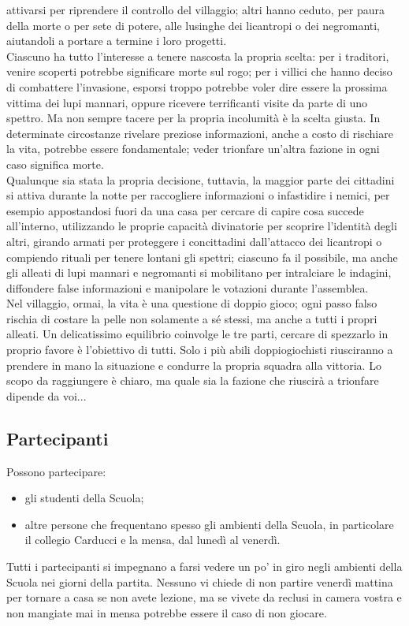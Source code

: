 \documentclass[a4paper,10pt]{article}
\begin{document}
attivarsi per riprendere il controllo del villaggio; altri hanno ceduto, per
paura della morte o per sete di potere, alle lusinghe dei licantropi o dei
negromanti, aiutandoli a portare a termine i loro progetti.\\
Ciascuno ha tutto l'interesse a tenere nascosta la propria scelta: per i
traditori, venire scoperti potrebbe significare morte sul rogo; per i villici
che hanno deciso di combattere l'invasione, esporsi troppo potrebbe voler dire
essere la prossima vittima dei lupi mannari, oppure ricevere terrificanti visite
da parte di uno spettro. Ma non sempre tacere per la propria incolumità è la
scelta giusta. In determinate circostanze rivelare preziose informazioni, anche
a costo di rischiare la vita, potrebbe essere fondamentale; veder trionfare
un'altra fazione in ogni caso significa morte.\\
Qualunque sia stata la propria decisione, tuttavia, la maggior parte dei
cittadini si attiva durante la notte per raccogliere informazioni o infastidire
i nemici, per esempio appostandosi fuori da una casa per cercare di capire cosa
succede all'interno, utilizzando le proprie capacità divinatorie per scoprire
l'identità degli altri, girando armati per proteggere i concittadini
dall'attacco dei licantropi o compiendo rituali per tenere lontani gli spettri;
ciascuno fa il possibile, ma anche gli alleati di lupi mannari e negromanti si
mobilitano per intralciare le indagini, diffondere false informazioni e
manipolare le votazioni durante l'assemblea.\\ 
Nel villaggio, ormai, la vita è una questione di doppio gioco; ogni passo falso
rischia di costare la pelle non solamente a sé stessi, ma anche a tutti i propri
alleati. Un delicatissimo equilibrio coinvolge le tre parti, cercare di
spezzarlo in proprio favore è l'obiettivo di tutti. Solo i più abili
doppiogiochisti riusciranno a prendere in mano la situazione e condurre la
propria squadra alla vittoria. Lo scopo da raggiungere è chiaro, ma quale sia la
fazione che riuscirà a trionfare dipende da voi...


\subsection{Partecipanti}
Possono partecipare:
\begin{itemize}
 \item gli studenti della Scuola;
 \item altre persone che frequentano spesso gli ambienti della Scuola, in
particolare il collegio Carducci e la mensa, dal lunedì al venerdì.
\end{itemize}
Tutti i partecipanti si impegnano a farsi vedere un po' in giro negli ambienti
della Scuola nei giorni della partita. Nessuno vi chiede di non partire venerdì
mattina per tornare a casa se non avete lezione, ma se vivete da reclusi in
camera vostra e non mangiate mai in mensa potrebbe essere il caso di non
giocare.
\end{document}
